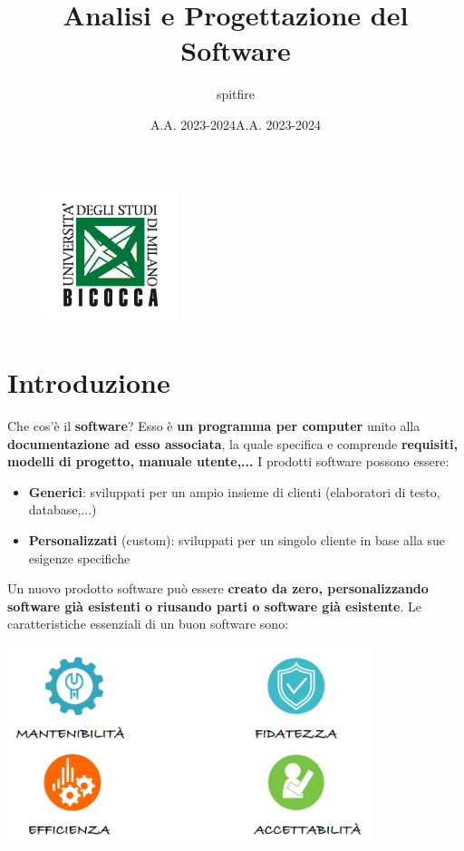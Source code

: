 \documentclass[12pt]{article}
\title{Analisi e Progettazione del Software}
\author{spitfire}
\date{A.A. 2023-2024}
\begin{document}
\begin{figure}
    \centering
    \includegraphics[width=0.35\textwidth]{Images/Logo scienze bicocca.png}
\end{figure}

\vspace{10cm}
\date{A.A. 2023-2024}


\maketitle

\newpage

\tableofcontents
\newpage

\section{Introduzione}
Che cos'è il \textbf{software}? Esso è \textbf{un programma per computer} unito alla \textbf{documentazione ad esso associata},
la quale specifica e comprende \textbf{requisiti, modelli di progetto, manuale utente,...} \newline
I prodotti software possono essere:
\begin{itemize}
    \item \textbf{Generici}: sviluppati per un ampio insieme di clienti (elaboratori di testo, database,...)
    \item \textbf{Personalizzati} (custom): sviluppati per un singolo cliente in base alla sue esigenze specifiche
\end{itemize}
Un nuovo prodotto software può essere \textbf{creato da zero, personalizzando software già esistenti o riusando parti o software già esistente}.
Le caratteristiche essenziali di un buon software sono:
\begin{center}
    \includegraphics[width = 0.80\textwidth]{Images/1.png}
\end{center}
\end{document}
